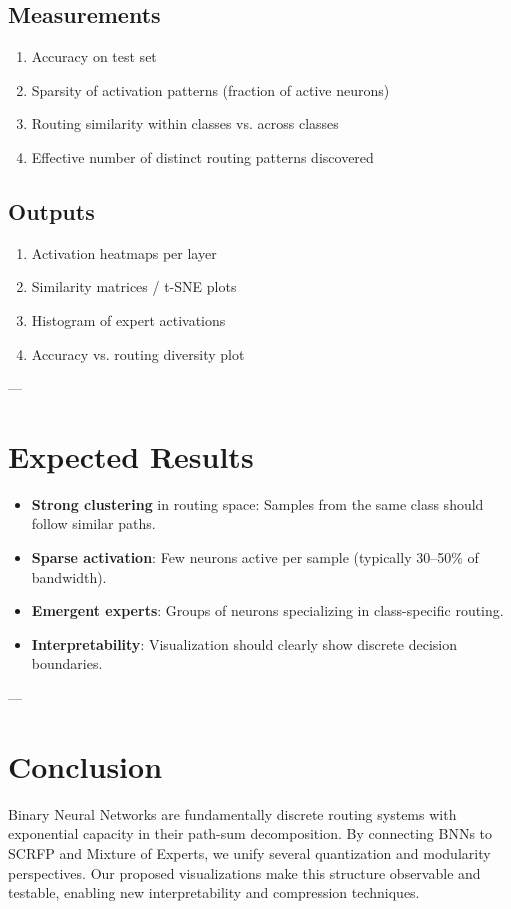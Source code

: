 \subsection{Measurements}
\begin{enumerate}
  \item Accuracy on test set
  \item Sparsity of activation patterns (fraction of active neurons)
  \item Routing similarity within classes vs. across classes
  \item Effective number of distinct routing patterns discovered
\end{enumerate}

\subsection{Outputs}
\begin{enumerate}
  \item Activation heatmaps per layer
  \item Similarity matrices / t-SNE plots
  \item Histogram of expert activations
  \item Accuracy vs. routing diversity plot
\end{enumerate}

---

\section{Expected Results}

\begin{itemize}
  \item \textbf{Strong clustering} in routing space: Samples from the same class should follow similar paths.
  \item \textbf{Sparse activation}: Few neurons active per sample (typically 30–50\% of bandwidth).
  \item \textbf{Emergent experts}: Groups of neurons specializing in class-specific routing.
  \item \textbf{Interpretability}: Visualization should clearly show discrete decision boundaries.
\end{itemize}

---

\section{Conclusion}

Binary Neural Networks are fundamentally discrete routing systems with exponential capacity in their path-sum decomposition.
By connecting BNNs to SCRFP and Mixture of Experts, we unify several quantization and modularity perspectives.
Our proposed visualizations make this structure observable and testable, enabling new interpretability and compression techniques.


